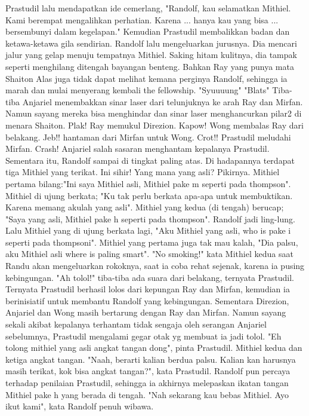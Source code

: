 \documentclass[a4paper,11pt,final]{article}
\begin{document}
Prastudil lalu mendapatkan ide cemerlang, "Randolf, kau selamatkan Mithiel. Kami berempat mengalihkan perhatian. Karena ... hanya kau yang bisa ... bersembunyi dalam kegelapan." Kemudian Prastudil membalikkan badan dan ketawa-ketawa gila sendirian.
Randolf lalu mengeluarkan jurusnya. Dia mencari jalur yang gelap menuju tempatnya Mithiel.
Saking hitam kulitnya, dia tampak seperti menghilang ditengah bayangan benteng. Bahkan Ray yang punya mata Shaiton Alas juga tidak dapat melihat kemana perginya Randolf, sehingga ia marah dan mulai menyerang kembali the fellowship.
"Syuuuung" "Blats" Tiba-tiba Anjariel menembakkan sinar laser dari telunjuknya ke arah Ray dan Mirfan. Namun sayang mereka bisa menghindar dan sinar laser menghancurkan pilar2 di menara Shaiton.
Plak! Ray memukul Direzion. Kapow! Wong membalas Ray dari belakang. Jeb!! hantaman dari Mirfan untuk Wong. Crot!! Prastudil meludahi Mirfan. Crash! Anjariel salah sasaran menghantam kepalanya Prastudil.
Sementara itu, Randolf sampai di tingkat paling atas. Di hadapannya terdapat tiga Mithiel yang terikat. Ini sihir! Yang mana yang asli? Pikirnya.
Mithiel pertama bilang:"Ini saya Mithiel asli, Mithiel pake m seperti pada thompson".
Mithiel di ujung berkata; "Ku tak perlu berkata apa-apa untuk membuktikan. Karena memang akulah yang asli".
Mithiel yang kedua (di tengah) berucap; "Saya yang asli, Mithiel pake h seperti pada thompson". Randolf jadi ling-lung.
Lalu Mithiel yang di ujung berkata lagi, "Aku Mithiel yang asli, who is pake i seperti pada thompsoni".
Mithiel yang pertama juga tak mau kalah, "Dia palsu, aku Mithiel asli where is paling smart".
"No smoking!" kata Mithiel kedua saat Randu akan mengeluarkan rokoknya, saat ia coba rehat sejenak, karena ia pusing kebingungan.
"Ah tolol!" tiba-tiba ada suara dari belakang, ternyata Prastudil.
Ternyata Prastudil berhasil lolos dari kepungan Ray dan Mirfan, kemudian ia berinisiatif untuk membantu Randolf yang kebingungan. Sementara Direzion, Anjariel dan Wong masih bertarung dengan Ray dan Mirfan.
Namun sayang sekali akibat kepalanya terhantam tidak sengaja oleh serangan Anjariel sebelumnya, Prastudil mengalami gegar otak yg membuat ia jadi tolol.
"Eh tolong mithiel yang asli angkat tangan dong", pinta Prastudil. Mithiel kedua dan ketiga angkat tangan. "Naah, berarti kalian berdua palsu. Kalian kan harusnya masih terikat, kok bisa angkat tangan?", kata Prastudil.
Randolf pun percaya terhadap penilaian Prastudil, sehingga ia akhirnya melepaskan ikatan tangan Mithiel pake h yang berada di tengah. "Nah sekarang kau bebas Mithiel. Ayo ikut kami", kata Randolf penuh wibawa.
\end{document}

